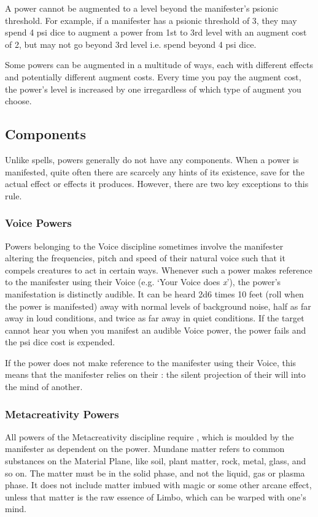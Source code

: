 A power cannot be augmented to a level beyond the manifester's
psionic threshold.
For example,
if a manifester has a psionic threshold of 3,
they may spend 4 psi dice to augment a power from
1st to 3rd level with an augment cost of 2,
but may not go beyond 3rd level i.e. spend beyond 4 psi dice.

Some powers can be augmented in a multitude of ways,
each with different effects
and potentially different augment costs.
Every time you pay the augment cost,
the power's level is increased by one
irregardless of which type of augment you choose.

\subsection{Components}
Unlike spells,
powers generally do not have any components.
When a power is manifested,
quite often there are scarcely any hints of its existence,
save for the actual effect or effects it produces.
However, there are two key exceptions to this rule.

\subsubsection{Voice Powers}
\label{subs:voice_powers}
Powers belonging to the Voice discipline sometimes involve
the manifester altering the frequencies, pitch and
speed of their natural voice such that it compels
creatures to act in certain ways.
Whenever such a power makes reference to the manifester
using their Voice (e.g. `Your Voice does \textit{x}'),
the power's manifestation is distinctly audible.
It can be heard 2d6 times 10 feet
(roll when the power is manifested)
away with normal levels of background noise,
half as far away in loud conditions,
and twice as far away in quiet conditions.
If the target cannot hear you when you manifest an
audible Voice power,
the power fails and the psi dice cost is expended.

If the power does not make reference to the manifester
using their Voice,
this means that the manifester relies on their
: the silent projection of their will
into the mind of another.

\subsubsection{Metacreativity Powers}
All powers of the Metacreativity discipline require
, which is moulded by the manifester
as dependent on the power.
Mundane matter refers to common substances on the
Material Plane,
like soil, plant matter, rock, metal,
glass, and so on.
The matter must be in the solid phase,
and not the liquid, gas or plasma phase.
It does not include matter imbued with magic
or some other arcane effect,
unless that matter is the raw essence of Limbo,
which can be warped with one's mind.

